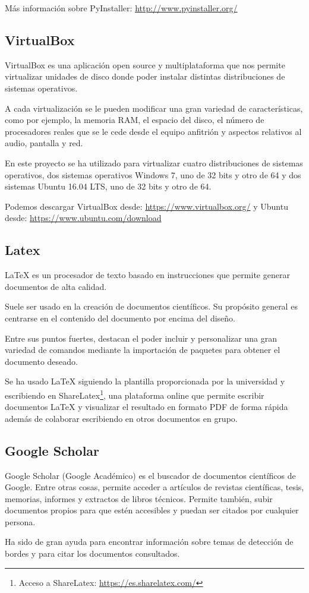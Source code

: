 Más información sobre PyInstaller: \url{http://www.pyinstaller.org/}

\subsection{VirtualBox}
VirtualBox es una aplicación open source y multiplataforma que nos permite virtualizar unidades de disco donde poder instalar distintas distribuciones de sistemas operativos.

A cada virtualización se le pueden modificar una gran variedad de características, como por ejemplo, la memoria RAM, el espacio del disco, el número de procesadores reales que se le cede desde el equipo anfitrión y aspectos relativos al audio, pantalla y red.

En este proyecto se ha utilizado para virtualizar cuatro distribuciones de sistemas operativos, dos sistemas operativos Windows 7, uno de 32 bits y otro de 64 y dos sistemas Ubuntu 16.04 LTS, uno de 32 bits y otro de 64. 

Podemos descargar VirtualBox desde: \url{https://www.virtualbox.org/} y Ubuntu desde: \url{https://www.ubuntu.com/download}

\subsection{Latex}
\LaTeX{} \cite{wiki:latex} es un procesador de texto basado en instrucciones que permite generar documentos de alta calidad. 

Suele ser usado en la creación de documentos científicos. Su propósito general es centrarse en el contenido del documento por encima del diseño.

Entre sus puntos fuertes, destacan el poder incluir y personalizar una gran variedad de comandos mediante la importación de paquetes para obtener el documento deseado.

Se ha usado \LaTeX{} siguiendo la plantilla proporcionada por la universidad y escribiendo en ShareLatex\footnote{Acceso a ShareLatex: \url{https://es.sharelatex.com/}}, una plataforma online que permite escribir documentos \LaTeX{} y visualizar el resultado en formato PDF de forma rápida además de colaborar escribiendo en otros documentos en grupo.

\subsection{Google Scholar}
Google Scholar (Google Académico) es el buscador de documentos científicos de Google. Entre otras cosas, permite acceder a artículos de revistas científicas, tesis, memorias, informes y extractos de libros técnicos. Permite también, subir documentos propios para que estén accesibles y puedan ser citados por cualquier persona.

Ha sido de gran ayuda para encontrar información sobre temas de detección de bordes y para citar los documentos consultados.